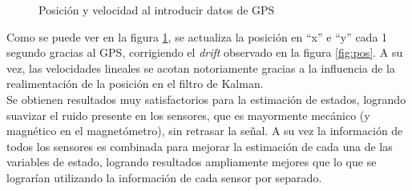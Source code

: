 \documentclass[main]{subfiles}
\begin{document}
\begin{figure} [h!]
	\centering
		 \hspace{10pt}
		\caption{Posición y velocidad al introducir datos de GPS}
		\label{fig:gps_posyvel}
\end{figure}

Como se puede ver en la figura \ref{fig:gps_posyvel}, se actualiza la posición en ``x'' e ``y'' cada 1 segundo gracias al GPS, corrigiendo el \emph{drift} observado en la figura \ref{fig:pos}. A su vez, las velocidades lineales se acotan notoriamente gracias a la influencia de la realimentación de la posición en el filtro de Kalman.\\

Se obtienen resultados muy satisfactorios para la estimación de estados, logrando suavizar el ruido presente en los sensores, que es mayormente mecánico (y magnético en el magnetómetro), sin retrasar la señal. A su vez la información de todos los sensores es combinada para mejorar la estimación de cada una de las variables de estado, logrando resultados ampliamente mejores que lo que se lograrían utilizando la información de cada sensor por separado.
\end{document}
